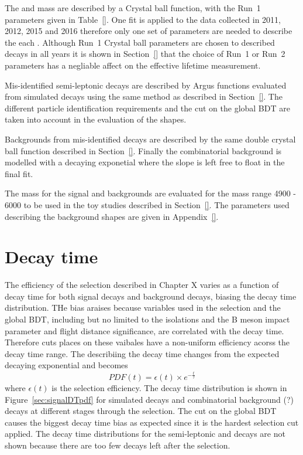 
The \bsmumu and \bdmumu mass \pdfs are described by a Crystal ball function, with the Run~1 parameters given in Table~\ref{}. One \ml fit is applied to the data collected in 2011, 2012, 2015 and 2016 therefore only one set of parameters are needed to describe the each \pdf. Although Run~1 Crystal ball parameters are chosen to described \bmumu decays in all years it is shown in Section~\ref{} that the choice of Run~1 or Run~2 parameters has a negliable affect on the effective lifetime measurement. 

Mis-identified semi-leptonic decays are described by Argus functions evaluated from simulated decays using the same method as described in Section~\ref{}. The different particle identification requirements and the cut on the global BDT are taken into account in the evaluation of the \pdf shapes.

Backgrounds from mis-identified \bhh decays are described by the same double crystal ball function described in Section~\ref{}. Finally the combinatorial background is modelled with a decaying exponetial where the slope is left free to float in the final fit.

The mass \pdfs for the signal and backgrounds are evaluated for the mass range 4900 - 6000 \mevcc to be used in the toy studies described in Section~\ref{}. The parameters used describing the background shapes are given in Appendix~\ref{}.


\section{Decay time \pdfs}
\label{sec:DTpdfs}
The efficiency of the selection described in Chapter X varies as a function of decay time for both signal \bsmumu decays and background decays, biasing the decay time distribution. THe bias araises because variables used in the selection and the global BDT, including but no limited to the isolations and the B meson impact parameter and flight distance significance, are correlated with the decay time. Therefore cuts places on these vaibales have a non-uniform efficiency acorss the decay time range. The \pdf describiing the decay time changes from the expected decaying exponential and becomes
\begin{equation}
PDF(t) = \epsilon(t) \times e^{-\frac{t}{\tau}}
\end{equation}
where $\epsilon(t)$ is the selection efficiency. 
The decay time distribution is shown in Figure~\ref{sec:signalDTpdf} for simulated \bsmumu decays and combinatorial background (?) decays at different stages through the selection. The cut on the global BDT causes the biggest decay time bias as expected since it is the hardest selection cut applied. The decay time distributions for the semi-leptonic and \bhh decays are not shown because there are too few decays left after the selection.

